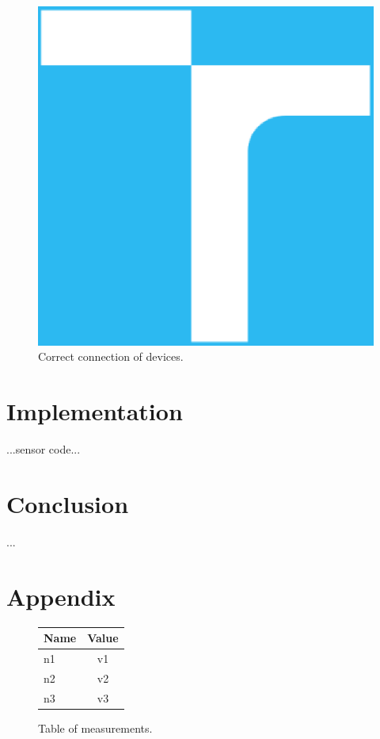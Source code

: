 \documentclass[11pt,a4paper]{article}
\begin{document}
\begin{figure}[H]
    \centering
    \includegraphics[scale=0.1]{img/vutbr-fit-logo.eps}
    \caption{Correct connection of devices.}
    \label{fig:connection}
\end{figure}

\section{Implementation}

...sensor code\cite{SENSOR}...

\section{Conclusion}

...

\newpage %

\section{Appendix}

\begin{figure}[H]
    \begin{center}
        \begin{tabular}{|l|c|}
            \hline
            \textbf{Name} & \textbf{Value} \\
            \hline\hline
            n1 & v1 \\\hline
            n2 & v2 \\\hline
            n3 & v3 \\\hline
        \end{tabular}
    \end{center}
    \caption{Table of measurements.}
    \label{fig:measurements}
\end{figure}
\end{document}
